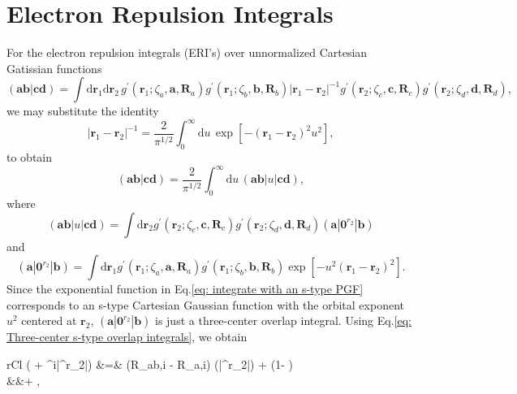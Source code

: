 \documentclass[11pt,a4paper]{article}
\begin{document}
	\section{Electron Repulsion Integrals}
	For the electron repulsion integrals (ERI's) over unnormalized Cartesian Gatissian functions
	\begin{equation}
		(\mathbf{a}\mathbf{b}|\mathbf{c}\mathbf{d}) = \int \mathrm{d} \mathbf{r}_1 \mathrm{d} \mathbf{r}_2\, g^{\prime}(\mathbf{r}_1; \zeta_a, \mathbf{a}, \mathbf{R}_a) g^{\prime}(\mathbf{r}_1; \zeta_b, \mathbf{b}, \mathbf{R}_b) \left| \mathbf{r}_1 - \mathbf{r}_2 \right|^{-1} g^{\prime}(\mathbf{r}_2; \zeta_c, \mathbf{c}, \mathbf{R}_c) g^{\prime}(\mathbf{r}_2; \zeta_d, \mathbf{d}, \mathbf{R}_d),
	\end{equation}
	we may substitute the identity
	\begin{equation}
		\left| \mathbf{r}_1 - \mathbf{r}_2 \right|^{-1} = \frac{2}{\pi^{1/2}} \int_{0}^{\infty} \mathrm{d}u\, \exp \left[ -(\mathbf{r}_1 - \mathbf{r}_2)^2 u^2 \right],
	\end{equation}
	to obtain
	\begin{equation}
		(\mathbf{a}\mathbf{b}|\mathbf{c}\mathbf{d}) = \frac{2}{\pi^{1/2}} \int_{0}^{\infty} \mathrm{d}u\, (\mathbf{a}\mathbf{b}|u|\mathbf{c}\mathbf{d}),
	\end{equation}
	where
	\begin{equation}
		(\mathbf{a}\mathbf{b}|u|\mathbf{c}\mathbf{d}) = \int \mathrm{d} \mathbf{r}_2 g^{\prime}(\mathbf{r}_2; \zeta_c, \mathbf{c}, \mathbf{R}_c) g^{\prime}(\mathbf{r}_2; \zeta_d, \mathbf{d}, \mathbf{R}_d) (\mathbf{a}|\mathbf{0}^{r_2}|\mathbf{b})
		\label{eq: (ab|u|cd)}
	\end{equation}
	and
	\begin{equation}
		(\mathbf{a}|\mathbf{0}^{r_2}|\mathbf{b}) = \int \mathrm{d} \mathbf{r}_1 g^{\prime}(\mathbf{r}_1; \zeta_a, \mathbf{a}, \mathbf{R}_a) g^{\prime}(\mathbf{r}_1; \zeta_b, \mathbf{b}, \mathbf{R}_b) \exp \left[ -u^2 (\mathbf{r}_1 - \mathbf{r}_2)^2 \right].
		\label{eq: integrate with an s-type PGF}
	\end{equation}
	Since the exponential function in Eq.\eqref{eq: integrate with an s-type PGF} corresponds to an s-type Cartesian Gaussian function with the orbital exponent $u^2$ centered at $\mathbf{r}_2$, $(\mathbf{a}|\mathbf{0}^{r_2}|\mathbf{b})$ is just a three-center overlap integral. Using Eq.\eqref{eq: Three-center s-type overlap integrals}, we obtain
	\begin{IEEEeqnarray}{rCl}
		( + ^i|^{r_2}|) &=& (R_{ab,i} - R_{a,i}) (|^{r_2}|) +  \left(1- \right)  \nonumber \\
		&&+   ,
		\label{eq: (a+1|0|b)}
	\end{IEEEeqnarray}
\end{document}
